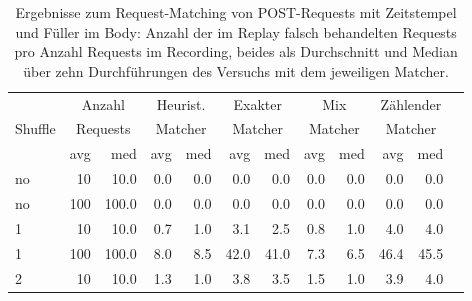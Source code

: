 \documentclass[12pt,a4paper]{report}
\begin{document}
\begin{table}[H]
	\centering
	\caption{
		Ergebnisse zum Request-Matching von POST-Requests mit Zeitstempel und Füller im Body:
		Anzahl der im Replay falsch behandelten Requests pro Anzahl Requests im Recording,
		beides als Durchschnitt und Median über zehn Durchführungen des Versuchs mit dem jeweiligen Matcher.
	}
	\label{tab:post}
	\begin{tabular}{|l|r|r|r|r|r|r|r|r|r|r|r|}
		\hline
		\multirow{3}{*}{Shuffle} & \multicolumn{2}{|c|}{Anzahl}   & \multicolumn{2}{|c|}{Heurist.} & \multicolumn{2}{|c|}{Exakter} & \multicolumn{2}{|c|}{Mix}     & \multicolumn{2}{|c|}{Zählender}                                    \\
		                         & \multicolumn{2}{|c|}{Requests} & \multicolumn{2}{|c|}{Matcher}  & \multicolumn{2}{|c|}{Matcher} & \multicolumn{2}{|c|}{Matcher} & \multicolumn{2}{|c|}{Matcher}                                      \\ \cline{2-11}
		                         & avg                            & med                            & avg                           & med                           & avg                             & med  & avg  & med  & avg  & med  \\ \hline
		no                       & 10                             & 10.0                           & 0.0                           & 0.0                           & 0.0                             & 0.0  & 0.0  & 0.0  & 0.0  & 0.0  \\ \hline
		no                       & 100                            & 100.0                          & 0.0                           & 0.0                           & 0.0                             & 0.0  & 0.0  & 0.0  & 0.0  & 0.0  \\ \hline
		1                        & 10                             & 10.0                           & 0.7                           & 1.0                           & 3.1                             & 2.5  & 0.8  & 1.0  & 4.0  & 4.0  \\ \hline
		1                        & 100                            & 100.0                          & 8.0                           & 8.5                           & 42.0                            & 41.0 & 7.3  & 6.5  & 46.4 & 45.5 \\ \hline
		2                        & 10                             & 10.0                           & 1.3                           & 1.0                           & 3.8                             & 3.5  & 1.5  & 1.0  & 3.9  & 4.0  \\ \hline

\end{tabular}
\end{table}
\end{document}
